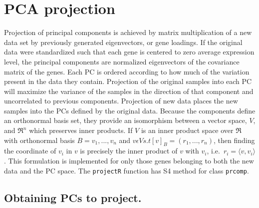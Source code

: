 \documentclass[]{article}
\begin{document}
\hypertarget{pca-projection}{%
\section{PCA projection}\label{pca-projection}}

Projection of principal components is achieved by matrix multiplication of a new data set by previously generated eigenvectors, or gene loadings. If the original data were standardized such that each gene is centered to zero average expression level, the principal components are normalized eigenvectors of the covariance matrix of the genes. Each PC is ordered according to how much of the variation present in the data they contain. Projection of the original samples into each PC will maximize the variance of the samples in the direction of that component and uncorrelated to previous components. Projection of new data places the new samples into the PCs defined by the original data. Because the components define an orthonormal basis set, they provide an isomorphism between a vector space, \(V\), and \(\Re^n\) which preserves inner products. If \(V\) is an inner product space over \(\Re\) with orthonormal basis \(B = v_1,...,v_n\) and \(v \epsilon V s.t [v]_B = (r_1,...,r_n)\), then finding the coordinate of \(v_i\) in \(v\) is precisely the inner product of \(v\) with \(v_i\), i.e.~\(r_i = \langle v,v_i \rangle\). This formulation is implemented for only those genes belonging to both the new data and the PC space. The \texttt{projectR} function has S4 method for class \texttt{prcomp}.

\hypertarget{obtaining-pcs-to-project.}{%
\subsection{Obtaining PCs to project.}\label{obtaining-pcs-to-project.}}
\end{document}
